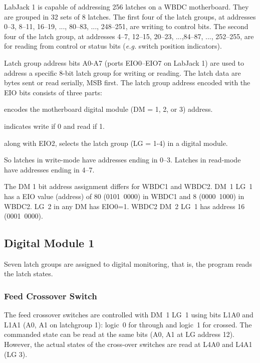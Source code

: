 \documentclass[letterpaper,11pt]{book}
\begin{document}
LabJack 1 is capable of addressing 256 latches on a WBDC motherboard.
They are grouped in 32 sets of 8 latches. The first four of the latch groups,
at addresses 0--3, 8--11, 16--19, ..., 80--83, ..., 248--251,
are writing to control bits. The second four of the latch group,
at addresses 4--7, 12--15, 20--23, ...,84--87, ..., 252--255,
are for reading from control or status bits ({\it e.g.} switch position 
indicators).

Latch group address bits A0-A7 (ports EIO0--EIO7 on LabJack 1) are used to 
address a specific 8-bit latch group for writing or reading. The latch data are
bytes sent or read serially, MSB first.  The latch group address encoded with 
the EIO bits consists of three parts:
\begin{description}\itemsep0pt \parskip0pt 
  \item[EIO7-EIO3]  encodes the motherboard digital module (DM = 1, 2, or 3) 
  address.
  \item[EIO2] indicates write if 0 and read if 1.
  \item[EIO1-EIO0] along with EIO2, selects the latch group (LG = 1-4) in a 
  digital  module.
\end{description}
So latches in write-mode have addresses ending in 0--3.  Latches in read-mode
have addresses ending in 4--7. 

The DM 1 bit address assignment differs for 
WBDC1 and WBDC2. DM~1 LG~1 has a EIO value (address) of 80 (0101~0000) in WBDC1
and 8 (0000~1000) in WBDC2. LG~2 in any DM has EIO0=1.   WBDC2 DM~2 LG~1 has 
address 16 (0001~0000).



\subsection{Digital Module 1}\label{subsec:DM1}

Seven latch groups are assigned to digital monitoring, that is, the program
reads the latch states.

\subsubsection{Feed Crossover Switch}

The feed crossover switches are controlled with DM~1 
LG~1 using bits L1A0 and
L1A1 (A0, A1 on latchgroup 1): logic~0 for through and logic~1 for 
crossed. The commanded state can be read at the same bits (A0, A1 at LG address
12). However, the actual states of the cross-over switches are read at L4A0 and
L4A1 (LG 3).
\end{document}

